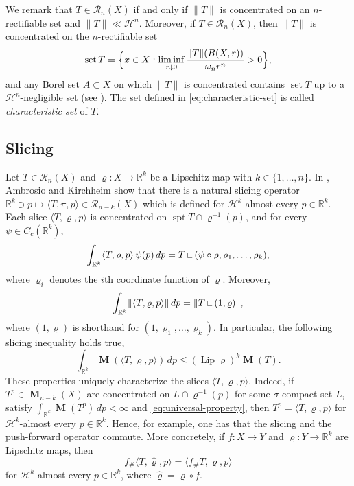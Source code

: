 \documentclass[reqno]{amsart}
\numberwithin{equation}{section}
\newcommand{\R}{\mathbb{R}}
\newcommand{\Ha}{\mathcal{H}}
\newcommand{\spt}{\operatorname{spt}}
\newcommand{\Lip}{\operatorname{Lip}}
\newcommand{\norm}[1]{\lVert#1\rVert}
\newcommand{\on}{\:\mbox{\rule{0.1ex}{1.2ex}\rule{1.1ex}{0.1ex}}\:}
\newcommand{\susbet}{\subset}
\DeclareMathOperator{\mass}{\mathbf{M}}
\DeclareMathOperator{\set}{set}
\renewcommand{\rho}{\varrho}
\begin{document}
We remark that $T\in \mathcal R_n(X)$ if and only if $\|T\|$ is concentrated on an $n$-rectifiable set and $\|T\|\ll \Ha^n$. Moreover, 
if \(T\in \mathcal{R}_n(X)\), then \(\norm{T}\) is concentrated on the \(n\)-rectifiable set
\begin{equation}\label{eq:characteristic-set}
\set T = \Bigl\{ x\in X : \liminf_{r\downarrow 0} \frac{\norm{T}(B(X, r))}{\omega_n r^n} >0\Bigr\},
\end{equation}
and any Borel set \(A\susbet X\) on which \(\norm{T}\) is concentrated contains \(\set T\) up to a \(\mathcal{H}^n\)-negligible set (see \cite[Theorem 4.6]{amb00} ). The set defined in \eqref{eq:characteristic-set} is called \emph{characteristic set} of \(T\).

\subsection{Slicing}\label{sec:slicing}
Let \(T\in \mathcal R_n(X)\)  and \(\rho \colon X\to \R^k\) be a Lipschitz map with \(k\in \{1, \dots, n\}\). In \cite[Theorems 5.6 and 5.7]{amb00}, Ambrosio and Kirchheim show that there is a natural slicing operator \(\R^k\ni p \mapsto \langle T, \pi, p\rangle \in \mathcal R_{n-k}(X)\) which is defined for \(\mathcal{H}^k\)-almost every \(p\in \R^k\). Each slice \(\langle T, \rho, p\rangle\) is concentrated on \(\spt T\cap  \rho^{-1}(p)\), and for every \(\psi \in  C_c(\R^k)\),
\begin{equation}\label{eq:universal-property}
\int_{\R^k} \langle T, \rho, p\rangle \, \psi(p) \, dp= T \on (\psi \circ \rho, \rho_1, \dots, \rho_k),
\end{equation}
where \(\rho_i\) denotes the \(i\)th coordinate function of \(\rho\).  Moreover, 
\begin{equation}\label{eq:mass-of-slices}
\int_{\R^k} \norm{\langle T, \rho, p\rangle} \, dp= \norm{T \on (1, \rho)},
\end{equation}
where \((1, \rho)\) is shorthand for \((1, \rho_1, \dots, \rho_k)\). In particular, the following slicing inequality holds true,
\[
\int_{\R^k} \mass{(\langle T, \rho, p\rangle)} \, dp \leq (\Lip \rho)^k \mass(T). 
\]
These properties uniquely characterize the slices \(\langle T, \rho, p\rangle\). Indeed, if \(T^p\in \mass_{n-k}(X)\) are concentrated on \(L \cap \rho^{-1}(p)\) for some \(\sigma\)-compact set \(L\), satisfy \(\int_{\R^k} \mass(T^p) \, dp < \infty\) and \eqref{eq:universal-property}, then \(T^p=\langle T, \rho, p\rangle\) for \(\Ha^k\)-almost every \(p\in \R^k\). Hence, for example, one has that the slicing and the push-forward operator commute. More concretely, if \(f\colon X\to Y\) and \(\rho\colon Y \to \R^k\) are Lipschitz maps, then
\begin{equation}\label{eq:slice-and-push-forward-commute}
f_\# \langle T, \widehat{\rho}, p \rangle=\langle f_\# T, \rho, p\rangle
\end{equation}
for \(\Ha^k\)-almost every \(p\in \R^k\), where \(\widehat{\rho}=\rho \circ f\).  
\end{document}
